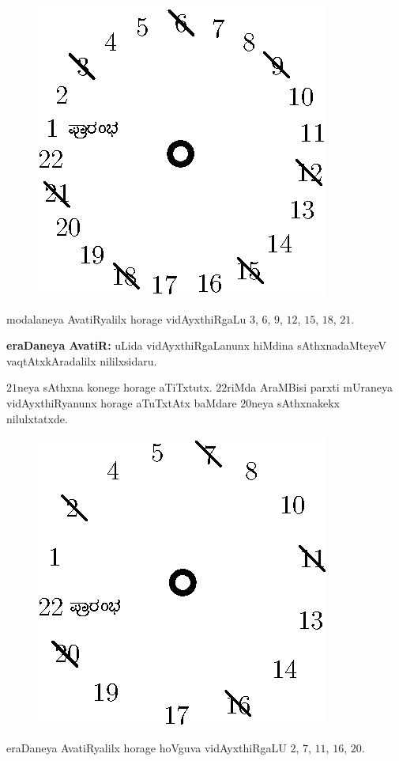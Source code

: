 \begin{figure}[H]
\centering
\includegraphics[scale=0.75]{src/figures/fig9.eps}
\end{figure}
 

modalaneya AvatiRyalilx horage vidAyxthiRgaLu $3$, $6$, $9$, $12$, $15$, $18$, $21$.

{\bf eraDaneya AvatiR:} uLida vidAyxthiRgaLanunx hiMdina sAthxnadaMteyeV vaqtAtxkAradalilx nililxsidaru.

$21$neya sAthxna konege horage aTiTxtutx. $22$riMda AraMBisi parxti mUraneya vidAyxthiRyanunx horage aTuTxtAtx baMdare $20$neya sAthxnakekx nilulxtatxde. 
\begin{figure}[H]
\centering
\includegraphics[scale=0.75]{src/figures/fig10.eps}
\end{figure}
eraDaneya AvatiRyalilx horage hoVguva vidAyxthiRgaLU $2$, $7$, $11$, $16$, $20$.

